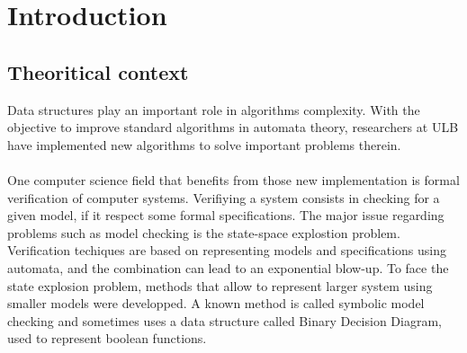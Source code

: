\documentclass[letterpaper]{article}
\theoremstyle{definition}
\begin{document}
%



\newpage

\tableofcontents

\newpage


\newpage

\section{Introduction}

\subsection{Theoritical context}

Data structures play an important role in algorithms complexity.
With the objective to improve standard algorithms in automata theory,
researchers at ULB
have implemented new algorithms to solve
important problems therein.

\paragraph{}

One computer science
field that benefits from
those new implementation is formal verification of computer systems.
Verifiying a system consists in checking for a given model, if
it respect some formal specifications.
The major issue regarding problems
such as model checking is the state-space explostion problem.
Verification techiques are based on representing
models and specifications using automata, and the combination
can lead to an exponential blow-up. To face the state explosion
problem, methods that allow to represent larger system using
smaller models were developped. A known method is called
symbolic model checking and sometimes uses a data structure called
Binary Decision Diagram, used to represent boolean functions.

\paragraph{}
\end{document}
